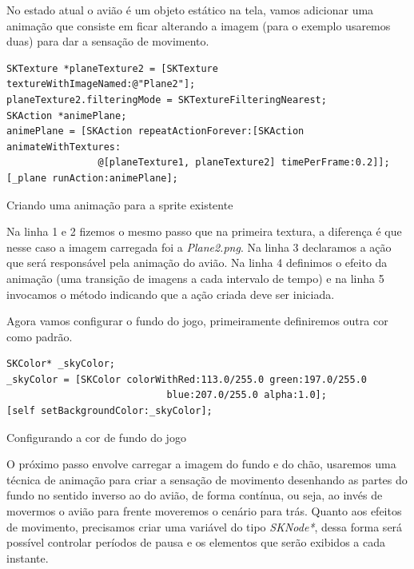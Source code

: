 \documentclass[a4paper,12pt,brazil,oneside]{book}
\begin{document}
No estado atual o avião é um objeto estático na tela, vamos adicionar uma animação que consiste em ficar alterando a imagem (para o exemplo usaremos duas) para dar a sensação de movimento.

\begin{listing}[H]
\begin{verbatim}
SKTexture *planeTexture2 = [SKTexture textureWithImageNamed:@"Plane2"];
planeTexture2.filteringMode = SKTextureFilteringNearest;
SKAction *animePlane;
animePlane = [SKAction repeatActionForever:[SKAction animateWithTextures:
				@[planeTexture1, planeTexture2] timePerFrame:0.2]];
[_plane runAction:animePlane];
\end{verbatim}
\caption{Criando uma animação para a sprite existente}
\end{listing}

Na linha 1 e 2 fizemos o mesmo passo que na primeira textura, a diferença é que nesse caso a imagem carregada foi a \emph{Plane2.png}. Na linha 3 declaramos a ação que será responsável pela animação do avião. Na linha 4 definimos o efeito da animação (uma transição de imagens a cada intervalo de tempo) e na linha 5 invocamos o método indicando que a ação criada deve ser iniciada.

Agora vamos configurar o fundo do jogo, primeiramente definiremos outra cor como padrão.

\begin{listing}[H]
\begin{verbatim}
SKColor* _skyColor;
_skyColor = [SKColor colorWithRed:113.0/255.0 green:197.0/255.0 
							blue:207.0/255.0 alpha:1.0];
[self setBackgroundColor:_skyColor];
\end{verbatim}
\caption{Configurando a cor de fundo do jogo}
\end{listing}

O próximo passo envolve carregar a imagem do fundo e do chão, usaremos uma técnica de animação para criar a sensação de movimento desenhando as partes do fundo no sentido inverso ao do avião, de forma contínua, ou seja, ao invés de movermos o avião para frente moveremos o cenário para trás.
Quanto aos efeitos de movimento, precisamos criar uma variável do tipo \emph{SKNode*}, dessa forma será possível controlar períodos de pausa e os elementos que serão exibidos a cada instante.
\end{document}
